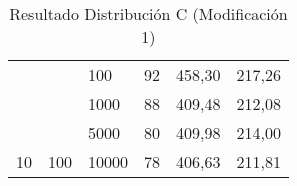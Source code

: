 \documentclass{article}
\begin{document}
\begin{table}[h]
\begin{tabular}{llllll}
			&                                                                       &                                                                           &                                                                              &                                                                                     &                                                                                       \\ \hline
			\multicolumn{1}{|l|}{}                                                 & \multicolumn{1}{l|}{}                                                 & \multicolumn{1}{l|}{100}                                                  & \multicolumn{1}{l|}{92}                                                      & \multicolumn{1}{l|}{458,30}                                                         & \multicolumn{1}{l|}{217,26}                                                           \\ \cline{3-6} 
			\multicolumn{1}{|l|}{}                                                 & \multicolumn{1}{l|}{}                                                 & \multicolumn{1}{l|}{1000}                                                 & \multicolumn{1}{l|}{88}                                                      & \multicolumn{1}{l|}{409,48}                                                         & \multicolumn{1}{l|}{212,08}                                                           \\ \cline{3-6} 
			\multicolumn{1}{|l|}{}                                                 & \multicolumn{1}{l|}{}                                                 & \multicolumn{1}{l|}{5000}                                                 & \multicolumn{1}{l|}{80}                                                      & \multicolumn{1}{l|}{409,98}                                                         & \multicolumn{1}{l|}{214,00}                                                           \\ \cline{3-6} 
			\multicolumn{1}{|l|}{\multirow{-4}{*}{10}}                             & \multicolumn{1}{l|}{\multirow{-4}{*}{100}}                            & \multicolumn{1}{l|}{10000}                                                & \multicolumn{1}{l|}{78}                                                      & \multicolumn{1}{l|}{406,63}                                                         & \multicolumn{1}{l|}{211,81}                                                           \\ \hline
		\end{tabular}
		\caption{Resultado Distribución C (Modificación 1)}
	\end{table}
\end{document}
